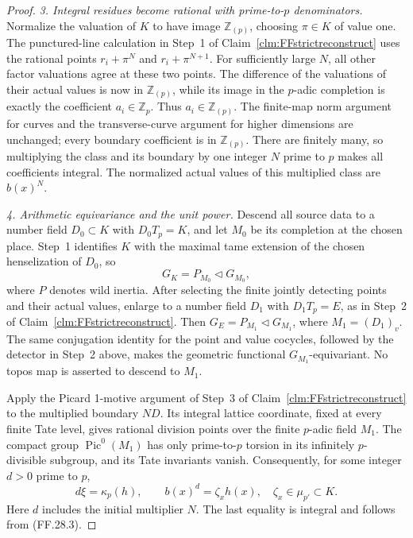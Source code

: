 \begin{proof}
\emph{3. Integral residues become rational with prime-to-\(p\)
denominators.}
Normalize the valuation of \(K\) to have image
\(\mathbb Z_{(p)}\), choosing \(\pi\in K\)
of value one. The punctured-line calculation in
Step~1 of Claim~\ref{clm:FFstrictreconstruct}
uses the rational points \(r_i+\pi^N\) and
\(r_i+\pi^{N+1}\). For sufficiently large \(N\),
all other factor valuations agree at these two
points. The difference of the valuations of their
actual values is now in \(\mathbb Z_{(p)}\),
while its image in the \(p\)-adic completion is
exactly the coefficient \(a_i\in\mathbb Z_p\).
Thus \(a_i\in\mathbb Z_{(p)}\).
The finite-map norm argument for curves and the
transverse-curve argument for higher dimensions
are unchanged; every boundary coefficient is
in \(\mathbb Z_{(p)}\). There are finitely many,
so multiplying the class and its boundary by
one integer \(N\) prime to \(p\) makes all
coefficients integral. The normalized actual
values of this multiplied class are \(b(x)^N\).

\emph{4. Arithmetic equivariance and the unit power.}
Descend all source data to a number field
\(D_0\subset K\) with \(D_0T_p=K\), and let
\(M_0\) be its completion at the chosen place.
Step~1 identifies \(K\) with the maximal tame
extension of the chosen henselization of \(D_0\), so
\[
            G_K=P_{M_0}\triangleleft G_{M_0},          \tag{FF.28.4}
\]
where \(P\) denotes wild inertia. After selecting
the finite jointly detecting points and their
actual values, enlarge to a number field \(D_1\)
with \(D_1T_p=E\), as in Step~2 of
Claim~\ref{clm:FFstrictreconstruct}. Then
\(G_E=P_{M_1}\triangleleft G_{M_1}\), where
\(M_1=(D_1)_v\). The same conjugation identity
for the point and value cocycles, followed by
the detector in Step~2 above, makes the geometric
functional \(G_{M_1}\)-equivariant. No topos
map is asserted to descend to \(M_1\).

Apply the Picard 1-motive argument of Step~3 of
Claim~\ref{clm:FFstrictreconstruct} to the
multiplied boundary \(ND\). Its integral lattice
coordinate, fixed at every finite Tate level,
gives rational division points over the finite
\(p\)-adic field \(M_1\). The compact group
\(\operatorname{Pic}^0(M_1)\) has only prime-to-\(p\)
torsion in its infinitely \(p\)-divisible subgroup,
and its Tate invariants vanish. Consequently, for
some integer \(d>0\) prime to \(p\),
\[
              d\xi=\kappa_p(h),\qquad
              b(x)^d=\zeta_x h(x),\quad
              \zeta_x\in\mu_{p'}\subset K.            \tag{FF.28.5}
\]
Here \(d\) includes the initial multiplier \(N\).
The last equality is integral and follows from
(FF.28.3).


\end{proof}
